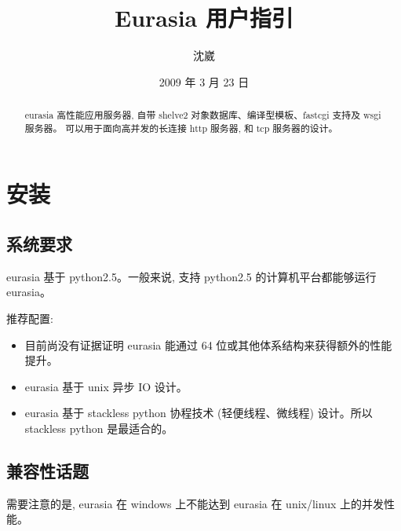 \documentclass{manual}
\title{Eurasia 用户指引}
\author{沈崴}
\date{2009 年 3 月 23 日}
\begin{document}
\maketitle

\begin{abstract}

\noindent

eurasia 高性能应用服务器, 自带 shelve2 对象数据库、编译型模板、fastcgi 支持及 wsgi 服务器。
可以用于面向高并发的长连接 http 服务器, 和 tcp 服务器的设计。

\end{abstract}

\tableofcontents

\chapter{安装}

\section{系统要求}

eurasia 基于 python2.5。一般来说, 支持 python2.5 的计算机平台都能够运行 eurasia。

推荐配置:

\begin{itemize}

\item {}

目前尚没有证据证明 eurasia 能通过 64 位或其他体系结构来获得额外的性能提升。

\item {}

eurasia 基于 unix 异步 IO 设计。

\item {}

eurasia 基于 stackless python 协程技术 (轻便线程、微线程) 设计。所以 stackless python 是最适合的。

\end{itemize}

\section{兼容性话题}


需要注意的是, eurasia 在 windows 上不能达到 eurasia 在 unix/linux 上的并发性能。
\end{document}
